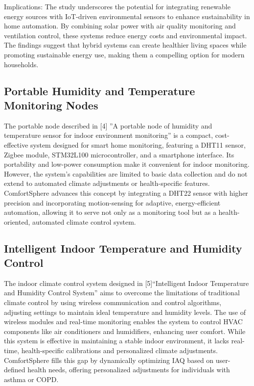 \documentclass[a4paper]{scrartcl}
\begin{document}
Implications:
The study underscores the potential for integrating renewable energy sources with IoT-driven environmental sensors to enhance sustainability in home automation. By combining solar power with air quality monitoring and ventilation control, these systems reduce energy costs and environmental impact. The findings suggest that hybrid systems can create healthier living spaces while promoting sustainable energy use, making them a compelling option for modern households.

\subsection{Portable Humidity and Temperature Monitoring Nodes}
The portable node described in [4] ”A portable node of humidity and temperature sensor for indoor environment monitoring” is a compact, cost-effective system designed for smart home monitoring, featuring a DHT11 sensor, Zigbee module, STM32L100 microcontroller, and a smartphone interface. Its portability and low-power consumption make it convenient for indoor monitoring. However, the system’s capabilities are limited to basic data collection and do not extend to automated climate adjustments or health-specific features. ComfortSphere advances this concept by integrating a DHT22 sensor with higher precision and incorporating motion-sensing for adaptive, energy-efficient automation, allowing it to serve not only as a monitoring tool but as a health-oriented, automated climate control system.

\subsection{Intelligent Indoor Temperature and Humidity Control}
The indoor climate control system designed in [5]“Intelligent Indoor Temperature and Humidity Control System” aims to overcome the limitations of traditional climate control by using wireless communication and control algorithms, adjusting settings to maintain ideal temperature and humidity levels. The use of wireless modules and real-time monitoring enables the system to control HVAC components like air conditioners and humidifiers, enhancing user comfort. While this system is effective in maintaining a stable indoor environment, it lacks real-time, health-specific calibrations and personalized climate adjustments. ComfortSphere fills this gap by dynamically optimizing IAQ based on user-defined health needs, offering personalized adjustments for individuals with asthma or COPD.
\end{document}
